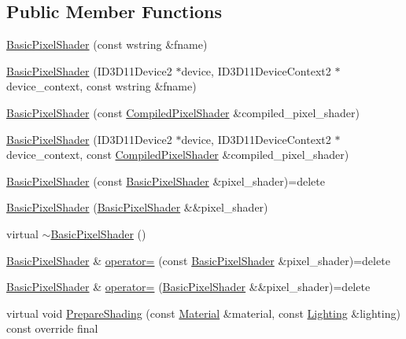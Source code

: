 \subsection*{Public Member Functions}
\begin{DoxyCompactItemize}
\item 
\hyperlink{classmage_1_1_basic_pixel_shader_ae89993e3ba1ab6461e4e984ee8c7b819}{Basic\+Pixel\+Shader} (const wstring \&fname)
\item 
\hyperlink{classmage_1_1_basic_pixel_shader_ac1864f219b2c0dff76fd12f4607dc634}{Basic\+Pixel\+Shader} (I\+D3\+D11\+Device2 $\ast$device, I\+D3\+D11\+Device\+Context2 $\ast$device\+\_\+context, const wstring \&fname)
\item 
\hyperlink{classmage_1_1_basic_pixel_shader_a775a07e4b99ee726cff163fd00fb07f5}{Basic\+Pixel\+Shader} (const \hyperlink{structmage_1_1_compiled_pixel_shader}{Compiled\+Pixel\+Shader} \&compiled\+\_\+pixel\+\_\+shader)
\item 
\hyperlink{classmage_1_1_basic_pixel_shader_a78887590e4ed3b769b68051ad9aa0db5}{Basic\+Pixel\+Shader} (I\+D3\+D11\+Device2 $\ast$device, I\+D3\+D11\+Device\+Context2 $\ast$device\+\_\+context, const \hyperlink{structmage_1_1_compiled_pixel_shader}{Compiled\+Pixel\+Shader} \&compiled\+\_\+pixel\+\_\+shader)
\item 
\hyperlink{classmage_1_1_basic_pixel_shader_ab82055206ff2a05b73f18ce23353a4bb}{Basic\+Pixel\+Shader} (const \hyperlink{classmage_1_1_basic_pixel_shader}{Basic\+Pixel\+Shader} \&pixel\+\_\+shader)=delete
\item 
\hyperlink{classmage_1_1_basic_pixel_shader_a0a5366edb694e78e4c8075fad70b7dff}{Basic\+Pixel\+Shader} (\hyperlink{classmage_1_1_basic_pixel_shader}{Basic\+Pixel\+Shader} \&\&pixel\+\_\+shader)
\item 
virtual \hyperlink{classmage_1_1_basic_pixel_shader_a7b4ac308850eb9ad55cbbd1e6389271b}{$\sim$\+Basic\+Pixel\+Shader} ()
\item 
\hyperlink{classmage_1_1_basic_pixel_shader}{Basic\+Pixel\+Shader} \& \hyperlink{classmage_1_1_basic_pixel_shader_a9656fdae2d17691d3e7dd850e7844efb}{operator=} (const \hyperlink{classmage_1_1_basic_pixel_shader}{Basic\+Pixel\+Shader} \&pixel\+\_\+shader)=delete
\item 
\hyperlink{classmage_1_1_basic_pixel_shader}{Basic\+Pixel\+Shader} \& \hyperlink{classmage_1_1_basic_pixel_shader_a5d6224f0454d1d1f9583f6b9f8ad8201}{operator=} (\hyperlink{classmage_1_1_basic_pixel_shader}{Basic\+Pixel\+Shader} \&\&pixel\+\_\+shader)=delete
\item 
virtual void \hyperlink{classmage_1_1_basic_pixel_shader_a67ce881c6c02b2ceabca29cd3b6a4a89}{Prepare\+Shading} (const \hyperlink{structmage_1_1_material}{Material} \&material, const \hyperlink{structmage_1_1_lighting}{Lighting} \&lighting) const override final
\end{DoxyCompactItemize}
